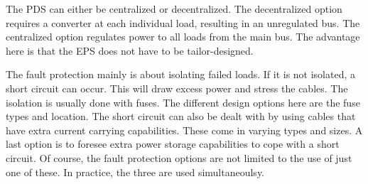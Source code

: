 The PDS can either be centralized or decentralized. The decentralized option requires a converter at each individual load, resulting in an unregulated bus. The centralized option regulates power to all loads from the main bus. The advantage here is that the EPS does not have to be tailor-designed. 

The fault protection mainly is about isolating failed loads. If it is not isolated, a short circuit can occur. This will draw excess power and stress the cables. The isolation is usually done with fuses. The different design options here are the fuse types and location.
The short circuit can also be dealt with by using cables that have extra current carrying capabilities. These come in varying types and sizes.
A last option is to foresee extra power storage capabilities to cope with a short circuit.
Of course, the fault protection options are not limited to the use of just one of these. In practice, the three are used simultaneoulsy.